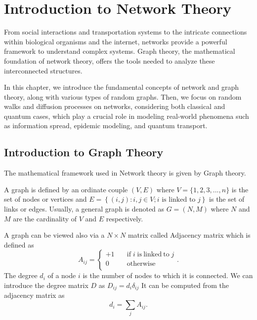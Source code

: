 \chapter{Introduction to Network Theory}\label{Network_Theory}

From social interactions and transportation systems to the intricate connections within biological organisms and the internet, networks provide a powerful framework to understand complex systems. Graph theory, the mathematical foundation of network theory, offers the tools needed to analyze these interconnected structures.

In this chapter, we introduce the fundamental concepts of network and graph theory, along with various types of random graphs.
Then, we focus on random walks and diffusion processes on networks, considering both classical and quantum cases, which play a crucial role in modeling real-world phenomena such as information spread, epidemic modeling, and quantum transport.


\section{Introduction to Graph Theory}

The mathematical framework used in Network theory is given by Graph theory. 

A graph is defined by an ordinate couple $(V,E)$ where $V = \{1,2,3, ...,n\}$ is the set of nodes or vertices and $E = \left\{ (i, j): i , j \in V ; i \text{ is linked to } j\right\}$ is the set of links or edges. Usually, a general graph is denoted as $G =(N,M)$ where $N$ and $M$ are the cardinality of $V$ and $E$ respectively.

A graph can be viewed also via a $N\times N$ matrix called Adjacency matrix which is defined as
\begin{equation}
    A_{ij}= \left\{ \begin{aligned}
        +1 &\quad \mathrm{if} \; i \; \mathrm{is ~linked ~to} \; j \\
        0 &\quad \mathrm{otherwise} \\
    \end{aligned} \right.  .
\end{equation}
The degree $d_i$ of a node $i$ is the number of nodes to which it is connected. We can introduce the degree matrix $D$ as $D_{ij} = d_i\delta_{ij}$
It can be computed from the adjacency matrix as
\begin{equation}
    d_i = \sum_j A_{ij}.
\end{equation}

